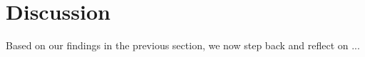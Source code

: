 \section{Discussion}
\label{discussion}

Based on our findings in the previous section, we now step back and reﬂect on ...